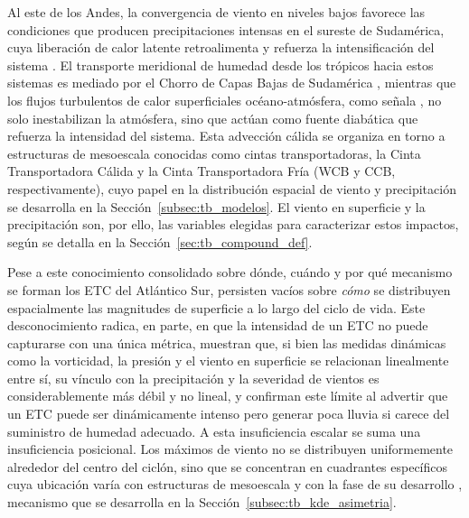 Al este de los Andes, la convergencia de viento en niveles bajos favorece las condiciones que producen precipitaciones intensas en el sureste de Sudamérica, cuya liberación de calor latente retroalimenta y refuerza la intensificación del sistema \citep{vera2002cold}.
El transporte meridional de humedad desde los trópicos hacia estos sistemas es mediado por el Chorro de Capas Bajas de Sudamérica \citep{reboita2026meteorology}, mientras que los flujos turbulentos de calor superficiales océano-atmósfera, como señala \citet{reboita2022from}, no solo inestabilizan la atmósfera, sino que actúan como fuente diabática que refuerza la intensidad del sistema.
Esta advección cálida se organiza en torno a estructuras de mesoescala conocidas como cintas transportadoras, la Cinta Transportadora Cálida y la Cinta Transportadora Fría (WCB y CCB, respectivamente), cuyo papel en la distribución espacial de viento y precipitación se desarrolla en la Sección~\ref{subsec:tb_modelos}.
El viento en superficie y la precipitación son, por ello, las variables elegidas para caracterizar estos impactos, según se detalla en la Sección~\ref{sec:tb_compound_def}.

Pese a este conocimiento consolidado sobre dónde, cuándo y por qué mecanismo se forman los ETC del Atlántico Sur, persisten vacíos sobre \emph{cómo} se distribuyen espacialmente las magnitudes de superficie a lo largo del ciclo de vida. 
Este desconocimiento radica, en parte, en que la intensidad de un ETC no puede capturarse con una única métrica, \citet{corner2025classification} muestran que, si bien las medidas dinámicas como la vorticidad, la presión y el viento en superficie se relacionan linealmente entre sí, su vínculo con la precipitación y la severidad de vientos es considerablemente más débil y no lineal, y \citet{sinclair2023relationship} confirman este límite al advertir que un ETC puede ser dinámicamente intenso pero generar poca lluvia si carece del suministro de humedad adecuado.
A esta insuficiencia escalar se suma una insuficiencia posicional. 
Los máximos de viento no se distribuyen uniformemente alrededor del centro del ciclón, sino que se concentran en cuadrantes específicos cuya ubicación varía con estructuras de mesoescala y con la fase de su desarrollo \citep{eisenstein2023identification}, mecanismo que se desarrolla en la Sección~\ref{subsec:tb_kde_asimetria}.

